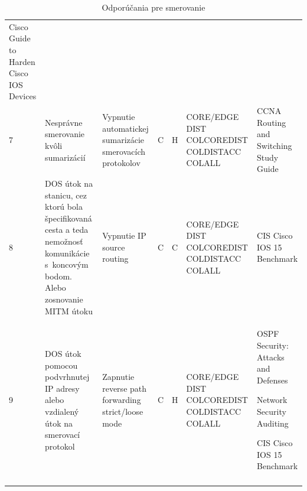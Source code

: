 \begin{longtable}[!htbp]{|C{2.5em}L{9em}L{9em}C{2em}C{2.5em}C{7.5em}L{10em}|}
	Cisco Guide to Harden Cisco IOS Devices \cite{Singh2018}\\
	 7	&Nesprávne smerovanie kvôli sumarizácií	&Vypnutie automatickej sumarizácie smerovacích protokolov	&C	&H	&CORE/EDGE
	DIST
	COLCOREDIST
	COLDISTACC
	COLALL	&CCNA Routing and Switching Study Guide \cite{Lammle2013}\\
	8	&DOS útok na stanicu, cez ktorú bola špecifikovaná cesta a teda nemožnosť komunikácie s~koncovým bodom. Alebo zosnovanie MITM útoku	&Vypnutie IP source routing	&C	&C	&CORE/EDGE
	DIST
	COLCOREDIST
	COLDISTACC
	COLALL	&CIS Cisco IOS 15 Benchmark \cite{CIS_DrTLsgXv24lxeIIM}\\
	 9	&DOS útok pomocou podvrhnutej IP adresy alebo vzdialený útok na smerovací protokol	&Zapnutie reverse path forwarding strict/loose mode	&C	&H	&CORE/EDGE
	DIST
	COLCOREDIST
	COLDISTACC
	COLALL	&OSPF Security: Attacks and Defenses \cite{Khandelwal2016}
	
	Network Security Auditing \cite{Jackson2010}
	
	CIS Cisco IOS 15 Benchmark \cite{CIS_DrTLsgXv24lxeIIM}\\
	
	\hline
	\caption{Odporúčania pre smerovanie}
	\label{tab:routing}%
\end{longtable}%

